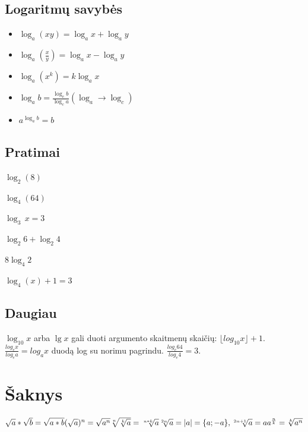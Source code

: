 \documentclass[fleqn]{article} %
\newenvironment{exercises}{\begin{enumerate*}[label=\alph*), itemjoin=\qquad]}{\end{enumerate*}}
\begin{document}
\subsection{Logaritmų savybės}
\begin{itemize}
    \item $\log_a(xy) = \log_a x + \log_a y$
    \item $\log_a(\frac{x}{y}) = \log_a x - \log_a y$
    \item $\log_a(x^k) = k\log_a x$
    \item $\log_a b = \frac{\log_c b}{\log_c a}$\qquad $(\log_a \rightarrow \log_c)$
    \item $a^{\log_a b} = b$
\end{itemize}

\subsection{Pratimai}

\begin{exercises}
    \item $\log_2(8)            $
    \item $\log_4(64)           $
    \item $\log_3\,x = 3        $
    \item $\log_2 6 + \log_2 4  $
    \item $8\log_4 2           $
    \item $\log_4(x) + 1 = 3    $
\end{exercises} 

\subsection{Daugiau}

$\log_{10} x$ arba $\lg x$ gali duoti argumento skaitmenų skaičių: $\lfloor log_{10} x \rfloor + 1$. \\
$\frac{log_e x}{log_e a} = log_a x$ duodą log su norimu pagrindu. $\frac{log_e 64}{log_e 4} = 3$.

\section{Šaknys}
\begin{math}
    \sqrt{a} * \sqrt{b} = \sqrt{a * b} \\
    (\sqrt{a})^n = \sqrt{a^n} \\
    \sqrt[n]{\sqrt[k]{a}} = \sqrt[n * k]{a} \\
    \sqrt[2n]{a} = |a| = \{a; -a\}, \sqrt[2n + 1]{a} = a \\
    a^{\frac{n}{k}} = \sqrt[k]{a^n}
\end{math}
\end{document}
